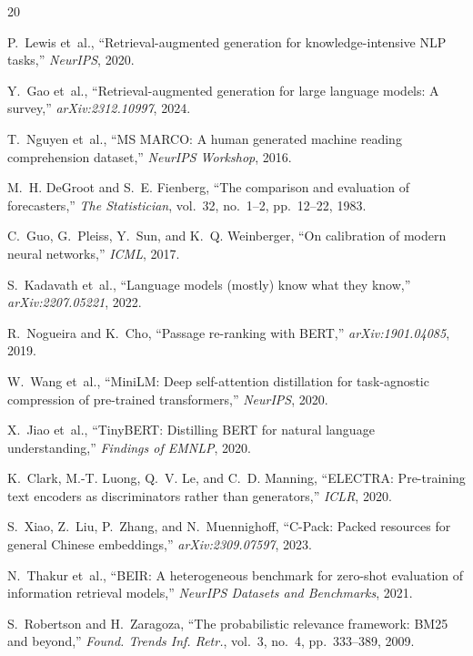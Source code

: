 \documentclass[conference]{IEEEtran}
\begin{document}

\begin{thebibliography}{20}

 P.~Lewis et~al.,
``Retrieval-augmented generation for knowledge-intensive NLP tasks,''
\emph{NeurIPS}, 2020.

 Y.~Gao et~al.,
``Retrieval-augmented generation for large language models: A survey,''
\emph{arXiv:2312.10997}, 2024.

 T.~Nguyen et~al.,
``MS MARCO: A human generated machine reading comprehension dataset,''
\emph{NeurIPS Workshop}, 2016.

 M.~H. DeGroot and S.~E. Fienberg,
``The comparison and evaluation of forecasters,''
\emph{The Statistician}, vol.~32, no.~1--2, pp.~12--22, 1983.

 C.~Guo, G.~Pleiss, Y.~Sun, and K.~Q. Weinberger,
``On calibration of modern neural networks,''
\emph{ICML}, 2017.

 S.~Kadavath et~al.,
``Language models (mostly) know what they know,''
\emph{arXiv:2207.05221}, 2022.

 R.~Nogueira and K.~Cho,
``Passage re-ranking with BERT,''
\emph{arXiv:1901.04085}, 2019.

 W.~Wang et~al.,
``MiniLM: Deep self-attention distillation for task-agnostic compression of
pre-trained transformers,''
\emph{NeurIPS}, 2020.

 X.~Jiao et~al.,
``TinyBERT: Distilling BERT for natural language understanding,''
\emph{Findings of EMNLP}, 2020.

 K.~Clark, M.-T. Luong, Q.~V. Le, and
C.~D. Manning,
``ELECTRA: Pre-training text encoders as discriminators rather than
generators,''
\emph{ICLR}, 2020.

 S.~Xiao, Z.~Liu, P.~Zhang, and N.~Muennighoff,
``C-Pack: Packed resources for general Chinese embeddings,''
\emph{arXiv:2309.07597}, 2023.

 N.~Thakur et~al.,
``BEIR: A heterogeneous benchmark for zero-shot evaluation of information
retrieval models,''
\emph{NeurIPS Datasets and Benchmarks}, 2021.

 S.~Robertson and H.~Zaragoza,
``The probabilistic relevance framework: BM25 and beyond,''
\emph{Found. Trends Inf. Retr.}, vol.~3, no.~4, pp.~333--389, 2009.


\end{thebibliography}
\end{document}
